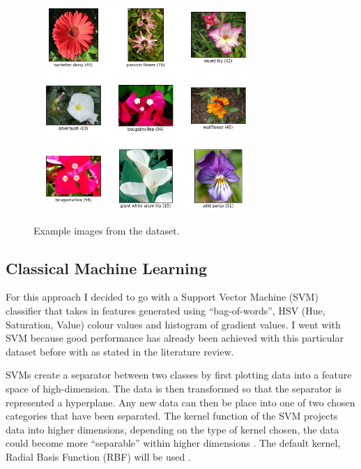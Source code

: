 \documentclass[12pt,a4paper]{report}
\begin{document}
\begin{figure}[h]\
    \centering
    \includegraphics[width=0.7\textwidth]{ox102examples.png}
    \caption{Example images from the dataset.}
    \label{fig:ox102}
\end{figure}

\subsection{Classical Machine Learning}

For this approach I decided to go with a Support Vector Machine (SVM) classifier that takes in features generated using 
“bag-of-words”, HSV (Hue, Saturation, Value) colour values and histogram of gradient values. I went with SVM because 
good performance has already been achieved with this particular dataset before with \citet{Nilsback2008} as 
stated in the 
literature review.

\par

SVMs create a separator between two classes by first plotting data into a feature space of high-dimension. The data is 
then transformed so that the separator is represented a hyperplane. Any new data can then be place into one of two 
chosen categories that have been separated. The kernel function of the SVM projects data into higher dimensions, 
depending on the type of kernel chosen, the data could become more “separable” within higher dimensions 
\citep{NobleWilliamS2006Wias}. The default kernel, Radial Basis Function (RBF) will be used \citep{sckikitsvm}. 

\par
\end{document}
